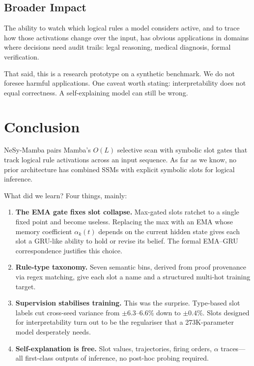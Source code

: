 \documentclass[conference]{IEEEtran}
\DeclareRobustCommand{\model}{NeSy-Mamba}
\begin{document}
\subsection{Broader Impact}

The ability to watch which logical rules a model considers active,
and to trace how those activations change over the input, has
obvious applications in domains where decisions need audit trails:
legal reasoning, medical diagnosis, formal verification.

That said, this is a research prototype on a synthetic benchmark.
We do not foresee harmful applications. One caveat worth
stating: interpretability does not equal correctness.
A self-explaining model can still be wrong.


\section{Conclusion}
\label{sec:conclusion}

\model{} pairs Mamba's $O(L)$ selective scan with symbolic slot
gates that track logical rule activations across an input
sequence. As far as we know, no prior architecture has combined
SSMs with explicit symbolic slots for logical inference.

What did we learn? Four things, mainly:

\begin{enumerate}[nosep]
    \item \textbf{The EMA gate fixes slot collapse.}  Max-gated
          slots ratchet to a single fixed point and become useless.
          Replacing the max with an EMA whose memory coefficient
          $\alpha_k(t)$ depends on the current hidden state gives
          each slot a GRU-like ability to hold or revise its
          belief. The formal EMA--GRU correspondence justifies
          this choice.

    \item \textbf{Rule-type taxonomy.}  Seven semantic bins,
          derived from proof provenance via regex matching, give
          each slot a name and a structured multi-hot training
          target.

    \item \textbf{Supervision stabilises training.}  This was
          the surprise. Type-based slot labels cut cross-seed
          variance from $\pm 6.3$--$6.6$\% down to $\pm 0.4$\%.
          Slots designed for interpretability turn out to be
          the regulariser that a 273K-parameter model desperately
          needs.

    \item \textbf{Self-explanation is free.}  Slot values,
          trajectories, firing orders, $\alpha$ traces---all
          first-class outputs of inference, no post-hoc probing
          required.
\end{enumerate}
\end{document}
